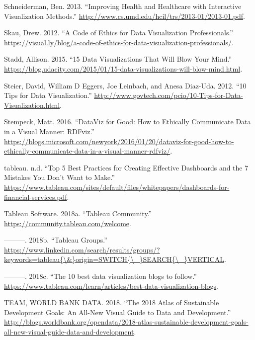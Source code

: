 \documentclass[]{book}
\theoremstyle{definition}
\theoremstyle{definition}
\theoremstyle{definition}
\theoremstyle{remark}
\begin{document}
\hypertarget{ref-data_viz_healthcare}{}
Schneiderman, Ben. 2013. ``Improving Health and Healthcare with
Interactive Visualization Methods.''
\url{http://www.cs.umd.edu/hcil/trs/2013-01/2013-01.pdf}.

\hypertarget{ref-ethics_code}{}
Skau, Drew. 2012. ``A Code of Ethics for Data Visualization
Professionals.''
\url{https://visual.ly/blog/a-code-of-ethics-for-data-visualization-professionals/}.

\hypertarget{ref-15_mindblowing}{}
Stadd, Allison. 2015. ``15 Data Visualizations That Will Blow Your
Mind.''
\url{https://blog.udacity.com/2015/01/15-data-visualizations-will-blow-mind.html}.

\hypertarget{ref-Steier}{}
Steier, David, William D Eggers, Joe Leinbach, and Anesa Diaz-Uda. 2012.
``10 Tips for Data Visualization.''
\url{http://www.govtech.com/pcio/10-Tips-for-Data-Visualization.html}.

\hypertarget{ref-dataviz_for_good}{}
Stempeck, Matt. 2016. ``DataViz for Good: How to Ethically Communicate
Data in a Visual Manner: RDFviz.''
\url{https://blogs.microsoft.com/newyork/2016/01/20/dataviz-for-good-how-to-ethically-communicate-data-in-a-visual-manner-rdfviz/}.

\hypertarget{ref-dashboard_practices}{}
tableau. n.d. ``Top 5 Best Practices for Creating Effective Dashboards
and the 7 Mistakes You Don't Want to Make.''
\href{\%20https://www.tableau.com/sites/default/files/whitepapers/dashboards-for-financial-services.pdf\%20}{https://www.tableau.com/sites/default/files/whitepapers/dashboards-for-financial-services.pdf}.

\hypertarget{ref-Tableau_Community}{}
Tableau Software. 2018a. ``Tableau Community.''
\url{https://community.tableau.com/welcome}.

\hypertarget{ref-LinkedIn_Groups}{}
---------. 2018b. ``Tableau Groups.''
\href{https://www.linkedin.com/search/results/groups/?keywords=tableau\%7B/\&\%7Dorigin=SWITCH\%7B/_\%7DSEARCH\%7B/_\%7DVERTICAL}{https://www.linkedin.com/search/results/groups/?keywords=tableau\{\textbackslash{}\&\}origin=SWITCH\{\textbackslash{}\_\}SEARCH\{\textbackslash{}\_\}VERTICAL}.

\hypertarget{ref-Top_10_Blogs}{}
---------. 2018c. ``The 10 best data visualization blogs to follow.''
\url{https://www.tableau.com/learn/articles/best-data-visualization-blogs}.

\hypertarget{ref-world_bank_data}{}
TEAM, WORLD BANK DATA. 2018. ``The 2018 Atlas of Sustainable Development
Goals: An All-New Visual Guide to Data and Development.''
\url{http://blogs.worldbank.org/opendata/2018-atlas-sustainable-development-goals-all-new-visual-guide-data-and-development}.
\end{document}

